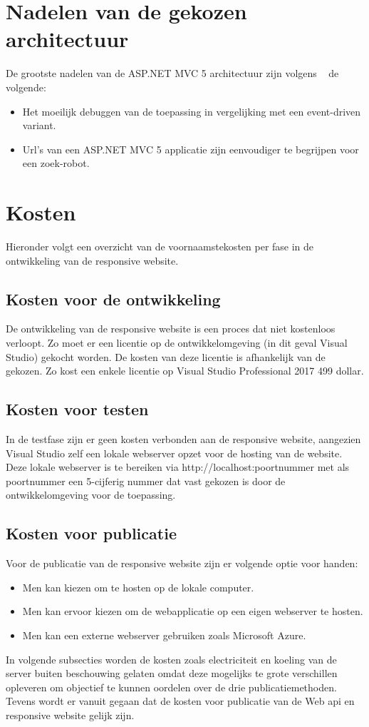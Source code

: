 \section{Nadelen van de gekozen architectuur}
De grootste nadelen van de ASP.NET MVC 5 architectuur zijn volgens ~\cite{hasaspnetcorekilledwebforms} de volgende:
\begin{itemize}
  \item Het moeilijk debuggen van de toepassing in vergelijking met een event-driven variant.
  \item Url's van een ASP.NET MVC 5 applicatie zijn eenvoudiger te begrijpen voor een zoek-robot.
\end{itemize}

\section{Kosten}
Hieronder volgt een overzicht van de voornaamstekosten per fase in de ontwikkeling van de responsive website.
\subsection{Kosten voor de ontwikkeling}
De ontwikkeling van de responsive website is een proces dat niet kostenloos verloopt. Zo moet er een licentie op de ontwikkelomgeving (in dit geval Visual Studio) gekocht worden.
De kosten van deze licentie is afhankelijk van de gekozen. Zo kost een enkele licentie op Visual Studio Professional 2017 499 dollar.

\subsection{Kosten voor testen}
In de testfase zijn er geen kosten verbonden aan de responsive website, aangezien Visual Studio zelf een lokale webserver opzet
voor de hosting van de website. Deze lokale webserver is te bereiken via http://localhost:poortnummer met als poortnummer een
5-cijferig nummer dat vast gekozen is door de ontwikkelomgeving voor de toepassing.
\subsection{Kosten voor publicatie}
Voor de publicatie van de responsive website zijn er volgende optie voor handen:
\begin{itemize}
  \item Men kan kiezen om te hosten op de lokale computer.
  \item Men kan ervoor kiezen om de webapplicatie op een eigen webserver te hosten.
  \item Men kan een externe webserver gebruiken zoals Microsoft Azure.
\end{itemize}
In volgende subsecties worden de kosten zoals electriciteit en koeling van de server buiten beschouwing gelaten omdat deze
mogelijks te grote verschillen opleveren om objectief te kunnen oordelen over de drie publicatiemethoden. Tevens wordt er vanuit
gegaan dat de kosten voor publicatie van de Web api en responsive website gelijk zijn.


